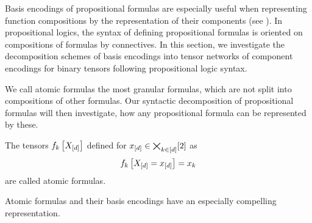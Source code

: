 
Basis encodings of propositional formulas are especially useful when representing function compositions by the representation of their components (see ).
In propositional logics, the syntax of defining propositional formulas is oriented on compositions of formulas by connectives. %
In this section, we investigate the decomposition schemes of basis encodings into tensor networks of component encodings for binary tensors following propositional logic syntax.


We call atomic formulas the most granular formulas, which are not split into compositions of other formulas.
Our syntactic decomposition of propositional formulas will then investigate, how any propositional formula can be represented by these.

\begin{definition}
    The tensors $f_{k}\left[X_{[d]}\right]$ defined for $x_{[d]}\in\bigtimes_{k\in[d]}[2]$ as
    \begin{align*}
        f_{k}\left[X_{[d]}=x_{[d]}\right]
        = x_{k}
    \end{align*}
    are called atomic formulas.
\end{definition}

Atomic formulas and their basis encodings have an especially compelling representation.

